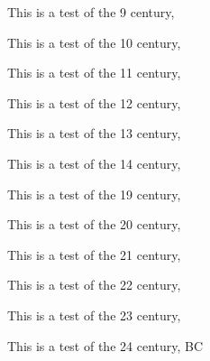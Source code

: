 \documentclass{article}
\begin{document}
This is a test of the 9 century, 

This is a test of the 10 century, 

This is a test of the 11 century, 

This is a test of the 12 century, 

This is a test of the 13 century, 

This is a test of the 14 century, 

This is a test of the 19 century, 

This is a test of the 20 century, 

This is a test of the 21 century, 

This is a test of the 22 century, 

This is a test of the 23 century, 

This is a test of the 24 century,  BC
\end{document}
